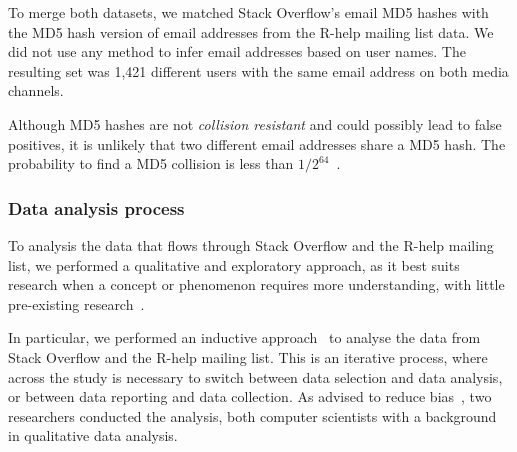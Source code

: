 \documentclass{sig-alternate-05-2015}
\begin{document}
To merge both datasets, we matched Stack Overflow's email MD5 hashes with the MD5 hash version of email addresses from the R-help mailing list data.
We did not use any method to infer email addresses based on user names.
The resulting set was 1,421 different users with the same email address on both media channels.


Although MD5 hashes are not \textit{collision resistant} and could possibly lead to false positives, it is unlikely that two different email addresses share a MD5 hash.
    The probability to find a MD5 collision is less than $1/2^{64}$~\cite{Rivest1992}.

\subsubsection{Data analysis process}
\label{sec:dap}

To analysis the data that flows through Stack Overflow and the R-help mailing list, we performed a qualitative and exploratory approach, as it best suits research when a concept or phenomenon requires more understanding, with little pre-existing research~\cite{Creswell2009}.

In particular, we performed an inductive approach~\cite{Runeson2012} to analyse the data from Stack Overflow and the R-help mailing list.
This is an iterative process, where across the study is necessary to switch between data selection and data analysis, or between data reporting and data collection.
As advised to reduce bias~\cite{Runeson2012}, two researchers conducted the analysis, both computer scientists with a background in qualitative data analysis.

\end{document}
